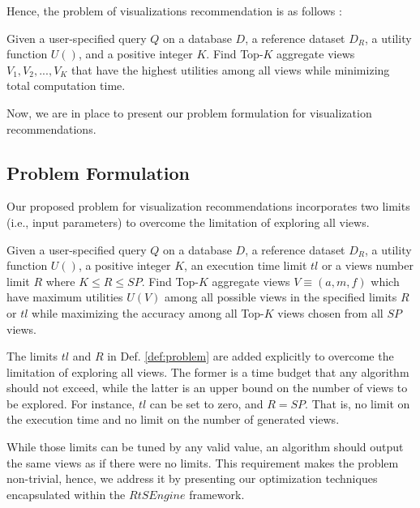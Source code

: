 Hence, the problem of visualizations recommendation is as follows \cite{DBLP:journals/pvldb/VartakMPP14}:
%
\begin{definition}
Given a user-specified query $Q$ on a database $D$, a reference dataset $D_R$, a utility function $U()$, and a positive integer $K$. 
%
Find Top-$K$ aggregate views $V_1, V_2, ..., V_K$ that have the highest utilities among all views while minimizing total computation time.
%
\end{definition}
%

Now, we are in place to present our problem formulation for visualization recommendations.
%
\subsection{Problem Formulation}
\label{sec:problem_statement}
%
Our proposed problem for visualization recommendations incorporates two limits (i.e., input parameters) to overcome the limitation of exploring all views.
%
%
\begin{definition}
\label{def:problem}
%
Given a user-specified query $Q$ on a database $D$, a reference dataset $D_R$,  a utility function $U()$, a positive integer $K$, an execution time limit $tl$ or a views number limit $R$ where $K \leq R \leq SP$.
%
Find Top-$K$ aggregate views $V \equiv (a, m, f )$ which have maximum utilities $U(V)$ among all possible views in the 
specified limits $R$ or $tl$ while maximizing the accuracy among all Top-$K$ views chosen from all $SP$ views.
%
\end{definition}
%
The limits $tl$ and $R$ in Def. \ref{def:problem} are added explicitly to overcome the limitation of exploring all views.
%
The former is a time budget that any algorithm should not exceed, while the latter is an upper bound on the number of views to be explored.
%
For instance, $tl$ can be set to zero, and $R = SP$. That is, no limit on the execution time and no limit on the number of generated views.
%
%

While those limits can be tuned by any valid value, an algorithm should output the same views as if there were no limits. 
%
This requirement makes the problem non-trivial, hence, we address it by presenting our optimization techniques encapsulated within the $RtSEngine$ framework.
%
